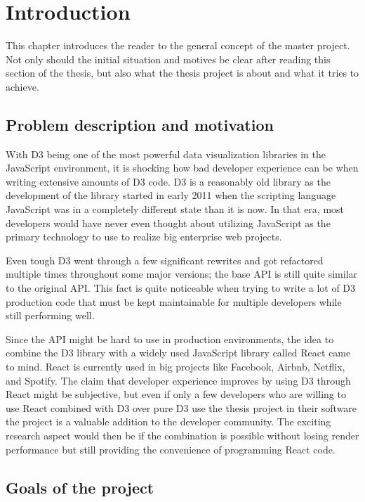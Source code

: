 \chapter{Introduction}
\label{cha:Introduction}

This chapter introduces the reader to the general concept of the master project. Not only should the initial situation and motives be clear after reading this section of the thesis, but also what the thesis project is about and what it tries to achieve.

\section{Problem description and motivation}

With D3 being one of the most powerful data visualization libraries in the JavaScript environment, it is shocking how bad developer experience can be when writing extensive amounts of D3 code. D3 is a reasonably old library as the development of the library started in early 2011 when the scripting language JavaScript was in a completely different state than it is now. In that era, most developers would have never even thought about utilizing JavaScript as the primary technology to use to realize big enterprise web projects. 

Even tough D3 went through a few significant rewrites and got refactored multiple times throughout some major versions; the base API is still quite similar to the original API. This fact is quite noticeable when trying to write a lot of D3 production code that must be kept maintainable for multiple developers while still performing well.

Since the API might be hard to use in production environments, the idea to combine the D3 library with a widely used JavaScript library called React came to mind. React is currently used in big projects like Facebook, Airbnb, Netflix, and Spotify. The claim that developer experience improves by using D3 through React might be subjective, but even if only a few developers who are willing to use React combined with D3 over pure D3 use the thesis project in their software the project is a valuable addition to the developer community. The exciting research aspect would then be if the combination is possible without losing render performance but still providing the convenience of programming React code.

\section{Goals of the project}

